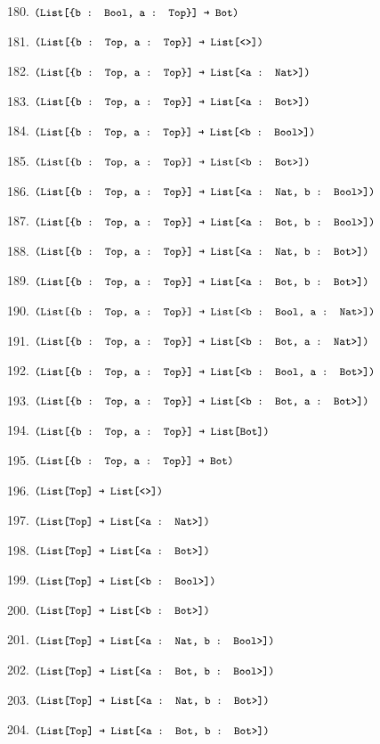 \documentclass[dvipsnames]{article}
\let\codeOrig\code
\renewcommand{\code}[2][]{%
  \ifmmode
    \if\relax\detokenize{#1}\relax
      \mathchoice{\mbox{\normalfont\small\ttfamily #2}}{\mbox{\normalfont\small\ttfamily #2}}{\mbox{\normalfont\small\ttfamily #2}}{\mbox{\normalfont\small\ttfamily #2}}%
    \else
      \mathchoice{\mbox{\normalfont\small\ttfamily #2}}{\mbox{\normalfont\small\ttfamily #2}}{\mbox{\normalfont\small\ttfamily #2}}{\mbox{\normalfont\small\ttfamily #2}}%
    \fi
  \else
    \codeOrig[#1]{#2}%
  \fi}
\begin{document}
\begin{enumerate}
      180. $\code{(List[\{b : Bool, a : Top\}] → Bot)}$

      181. $\code{(List[\{b : Top, a : Top\}] → List[<>])}$

      182. $\code{(List[\{b : Top, a : Top\}] → List[<a : Nat>])}$

      183. $\code{(List[\{b : Top, a : Top\}] → List[<a : Bot>])}$

      184. $\code{(List[\{b : Top, a : Top\}] → List[<b : Bool>])}$

      185. $\code{(List[\{b : Top, a : Top\}] → List[<b : Bot>])}$

      186. $\code{(List[\{b : Top, a : Top\}] → List[<a : Nat, b : Bool>])}$

      187. $\code{(List[\{b : Top, a : Top\}] → List[<a : Bot, b : Bool>])}$

      188. $\code{(List[\{b : Top, a : Top\}] → List[<a : Nat, b : Bot>])}$

      189. $\code{(List[\{b : Top, a : Top\}] → List[<a : Bot, b : Bot>])}$

      190. $\code{(List[\{b : Top, a : Top\}] → List[<b : Bool, a : Nat>])}$

      191. $\code{(List[\{b : Top, a : Top\}] → List[<b : Bot, a : Nat>])}$

      192. $\code{(List[\{b : Top, a : Top\}] → List[<b : Bool, a : Bot>])}$

      193. $\code{(List[\{b : Top, a : Top\}] → List[<b : Bot, a : Bot>])}$

      194. $\code{(List[\{b : Top, a : Top\}] → List[Bot])}$

      195. $\code{(List[\{b : Top, a : Top\}] → Bot)}$

      196. $\code{(List[Top] → List[<>])}$

      197. $\code{(List[Top] → List[<a : Nat>])}$

      198. $\code{(List[Top] → List[<a : Bot>])}$

      199. $\code{(List[Top] → List[<b : Bool>])}$

      200. $\code{(List[Top] → List[<b : Bot>])}$

      201. $\code{(List[Top] → List[<a : Nat, b : Bool>])}$

      202. $\code{(List[Top] → List[<a : Bot, b : Bool>])}$

      203. $\code{(List[Top] → List[<a : Nat, b : Bot>])}$

      204. $\code{(List[Top] → List[<a : Bot, b : Bot>])}$


\end{enumerate}
\end{document}
